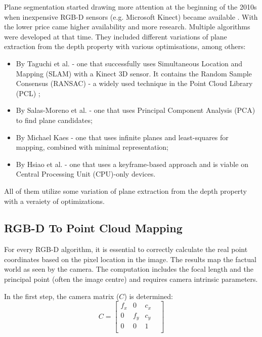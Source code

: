 Plane segmentation started drawing more attention at the beginning of the 2010s
when inexpensive RGB-D sensors (e.g. Microsoft Kinect) became available \cite{articleFPSLinePrimitivesRGBD}.
With the lower price came higher availability and more research.
Multiple algorithms were developed at that time.
They included different variations of plane extraction from the depth property with various optimisations,
among others:
\begin{itemize}
\item By Taguchi et al. \cite{inproceedingsEarlySLAMWithRANSACWithKinectSensor} - one that successfully uses
Simultaneous Location and Mapping (SLAM) with a Kinect 3D sensor.
It contains the Random Sample Consensus (RANSAC) \cite{articleRANSAC} - a widely used technique
in the Point Cloud Library (PCL) \cite{inproceedingsPCL};
\item By Salas-Moreno et al. \cite{inproceedingsPCAInSLAMToFindPlaneCandidates} - one that uses
Principal Component Analysis (PCA) to find plane candidates;
\item By Michael Kaes \cite{articleSLAMInfinitePlanes} - one that uses infinite planes and least-squares for mapping,
combined with minimal representation;
\item By Hsiao et al. \cite{inproceedingsKeyframeSLAM} - one that uses a keyframe-based approach
and is viable on Central Processing Unit (CPU)-only devices.
\end{itemize}
All of them utilize some variation of plane extraction from the depth property with a veraiety of optimizations.

\subsection{RGB-D To Point Cloud Mapping} \label{subsection:rgb-to-pc-mapping}

For every RGB-D algorithm, it is essential to correctly calculate the real point coordinates
based on the pixel location in the image.
The results map the factual world as seen by the camera.
The computation includes the focal length and the principal point (often the image centre)
and requires camera intrinsic parameters. 

In the first step, the camera matrix ($C$) is determined:
\begin{equation} \label{equation-camera-matrix}
	C = \begin{bmatrix}
		f_x &   0 & c_x & \\
		  0 & f_y & c_y & \\
		  0 &   0 &   1 & \\
	\end{bmatrix}
\end{equation}

